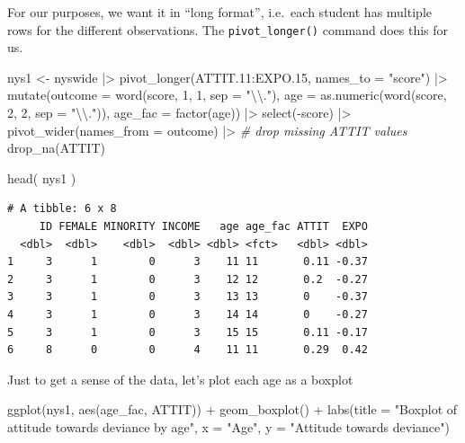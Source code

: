 \documentclass[
  letterpaper,
  DIV=11,
  numbers=noendperiod]{scrreprt}
\newenvironment{Shaded}{\begin{snugshade}}{\end{snugshade}}
\newcommand{\AttributeTok}[1]{\textcolor[rgb]{0.49,0.56,0.16}{#1}}
\newcommand{\CommentTok}[1]{\textcolor[rgb]{0.38,0.63,0.69}{\textit{#1}}}
\newcommand{\DecValTok}[1]{\textcolor[rgb]{0.25,0.63,0.44}{#1}}
\newcommand{\FloatTok}[1]{\textcolor[rgb]{0.25,0.63,0.44}{#1}}
\newcommand{\FunctionTok}[1]{\textcolor[rgb]{0.02,0.16,0.49}{#1}}
\newcommand{\NormalTok}[1]{\textcolor[rgb]{0.00,0.44,0.13}{#1}}
\newcommand{\OtherTok}[1]{\textcolor[rgb]{0.00,0.44,0.13}{#1}}
\newcommand{\SpecialCharTok}[1]{\textcolor[rgb]{0.25,0.44,0.63}{#1}}
\newcommand{\StringTok}[1]{\textcolor[rgb]{0.25,0.44,0.63}{#1}}
\begin{document}
For our purposes, we want it in ``long format'', i.e.~each student has
multiple rows for the different observations. The
\texttt{pivot\_longer()} command does this for us.

\begin{Shaded}
\begin{Highlighting}[]
\NormalTok{nys1 }\OtherTok{\textless{}{-}}\NormalTok{ nyswide }\SpecialCharTok{|\textgreater{}} 
  \FunctionTok{pivot\_longer}\NormalTok{(ATTIT}\FloatTok{.11}\SpecialCharTok{:}\NormalTok{EXPO}\FloatTok{.15}\NormalTok{, }\AttributeTok{names\_to =} \StringTok{"score"}\NormalTok{) }\SpecialCharTok{|\textgreater{}} 
  \FunctionTok{mutate}\NormalTok{(}\AttributeTok{outcome =} \FunctionTok{word}\NormalTok{(score, }\DecValTok{1}\NormalTok{, }\DecValTok{1}\NormalTok{, }\AttributeTok{sep =} \StringTok{"}\SpecialCharTok{\textbackslash{}\textbackslash{}}\StringTok{."}\NormalTok{),}
         \AttributeTok{age =} \FunctionTok{as.numeric}\NormalTok{(}\FunctionTok{word}\NormalTok{(score, }\DecValTok{2}\NormalTok{, }\DecValTok{2}\NormalTok{, }\AttributeTok{sep =} \StringTok{"}\SpecialCharTok{\textbackslash{}\textbackslash{}}\StringTok{."}\NormalTok{)),}
         \AttributeTok{age\_fac =} \FunctionTok{factor}\NormalTok{(age)) }\SpecialCharTok{|\textgreater{}} 
  \FunctionTok{select}\NormalTok{(}\SpecialCharTok{{-}}\NormalTok{score) }\SpecialCharTok{|\textgreater{}} 
  \FunctionTok{pivot\_wider}\NormalTok{(}\AttributeTok{names\_from =}\NormalTok{ outcome) }\SpecialCharTok{|\textgreater{}} 
  \CommentTok{\# drop missing ATTIT values}
  \FunctionTok{drop\_na}\NormalTok{(ATTIT)}

\FunctionTok{head}\NormalTok{( nys1 )}
\end{Highlighting}
\end{Shaded}

\begin{verbatim}
# A tibble: 6 x 8
     ID FEMALE MINORITY INCOME   age age_fac ATTIT  EXPO
  <dbl>  <dbl>    <dbl>  <dbl> <dbl> <fct>   <dbl> <dbl>
1     3      1        0      3    11 11       0.11 -0.37
2     3      1        0      3    12 12       0.2  -0.27
3     3      1        0      3    13 13       0    -0.37
4     3      1        0      3    14 14       0    -0.27
5     3      1        0      3    15 15       0.11 -0.17
6     8      0        0      4    11 11       0.29  0.42
\end{verbatim}

Just to get a sense of the data, let's plot each age as a boxplot

\begin{Shaded}
\begin{Highlighting}[]
  \FunctionTok{ggplot}\NormalTok{(nys1, }\FunctionTok{aes}\NormalTok{(age\_fac, ATTIT)) }\SpecialCharTok{+}
    \FunctionTok{geom\_boxplot}\NormalTok{() }\SpecialCharTok{+} 
    \FunctionTok{labs}\NormalTok{(}\AttributeTok{title =} \StringTok{"Boxplot of attitude towards deviance by age"}\NormalTok{, }
         \AttributeTok{x =} \StringTok{"Age"}\NormalTok{, }\AttributeTok{y =} \StringTok{"Attitude towards deviance"}\NormalTok{)}
\end{Highlighting}
\end{Shaded}
\end{document}

